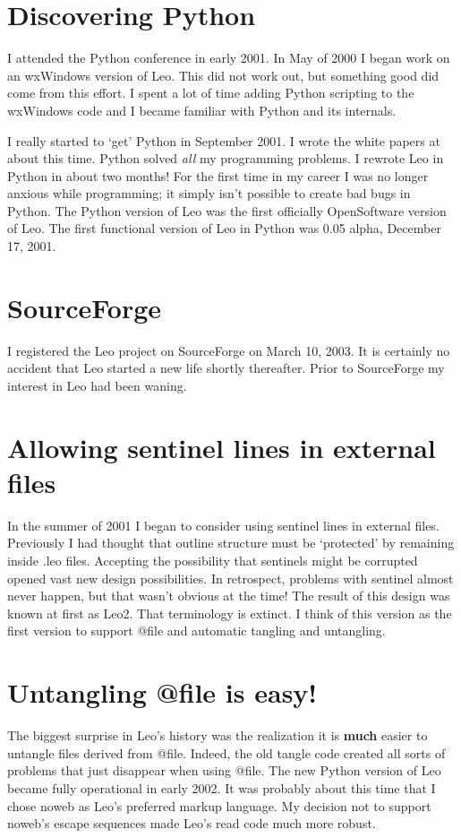 \documentclass[a4paper,10pt,english]{sphinxmanual}
\begin{document}
\section{Discovering Python}
\label{history:discovering-python}
I attended the Python conference in early 2001. In May of 2000 I began work on
an wxWindows version of Leo. This did not work out, but something good did come
from this effort. I spent a lot of time adding Python scripting to the wxWindows
code and I became familiar with Python and its internals.

I really started to `get' Python in September 2001. I wrote the white papers at
about this time. Python solved \emph{all} my programming problems. I rewrote Leo in
Python in about two months! For the first time in my career I was no longer
anxious while programming; it simply isn't possible to create bad bugs in
Python. The Python version of Leo was the first officially OpenSoftware version of
Leo. The first functional version of Leo in Python was 0.05 alpha, December 17,
2001.


\section{SourceForge}
\label{history:sourceforge}
I registered the Leo project on SourceForge on March 10, 2003. It is certainly
no accident that Leo started a new life shortly thereafter. Prior to SourceForge
my interest in Leo had been waning.


\section{Allowing sentinel lines in external files}
\label{history:allowing-sentinel-lines-in-external-files}
In the summer of 2001 I began to consider using sentinel lines in external files.
Previously I had thought that outline structure must be `protected' by remaining
inside .leo files. Accepting the possibility that sentinels might be corrupted
opened vast new design possibilities. In retrospect, problems with sentinel
almost never happen, but that wasn't obvious at the time! The result of this
design was known at first as Leo2. That terminology is extinct. I think of
this version as the first version to support @file and automatic tangling
and untangling.


\section{Untangling @file is easy!}
\label{history:untangling-file-is-easy}
The biggest surprise in Leo's history was the realization it is \textbf{much} easier
to untangle files derived from @file. Indeed, the old tangle code created all
sorts of problems that just disappear when using @file. The new Python version
of Leo became fully operational in early 2002. It was probably about this time
that I chose noweb as Leo's preferred markup language. My decision not to
support noweb's escape sequences made Leo's read code much more robust.
\end{document}
